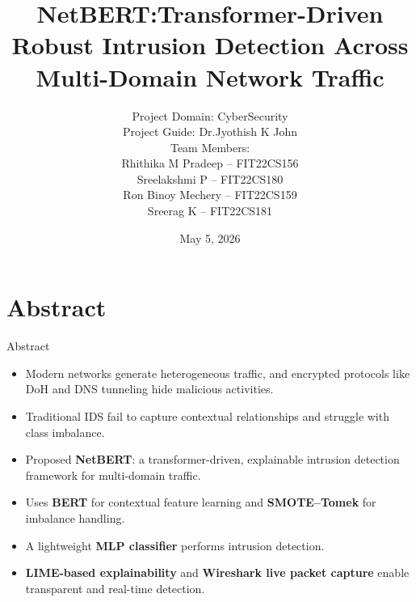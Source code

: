 \documentclass[aspectratio=169,xcolor=dvipsnames]{beamer}
\title{NetBERT:Transformer-Driven Robust Intrusion Detection Across Multi-Domain Network Traffic}
\author{\small Project Domain: CyberSecurity\\
Project Guide: Dr.Jyothish K John\\
Team Members: \\
Rhithika M Pradeep -- FIT22CS156 \\
Sreelakshmi P -- FIT22CS180 \\
Ron Binoy Mechery -- FIT22CS159 \\
Sreerag K -- FIT22CS181}
\date{\small May 5, 2026}%
\begin{document}
\begin{frame}
    \titlepage
\end{frame}

\section{Abstract}

\begin{frame}{Abstract}
\begin{itemize}

\item Modern networks generate heterogeneous traffic, and encrypted protocols like DoH and DNS tunneling hide malicious activities.

\item Traditional IDS fail to capture contextual relationships and struggle with class imbalance.

\item Proposed \textbf{NetBERT}: a transformer-driven, explainable intrusion detection framework for multi-domain traffic.

\item Uses \textbf{BERT} for contextual feature learning and \textbf{SMOTE–Tomek} for imbalance handling.

\item A lightweight \textbf{MLP classifier} performs intrusion detection.

\item \textbf{LIME-based explainability} and \textbf{Wireshark live packet capture} enable transparent and real-time detection.

\end{itemize}
\end{frame}
\end{document}
